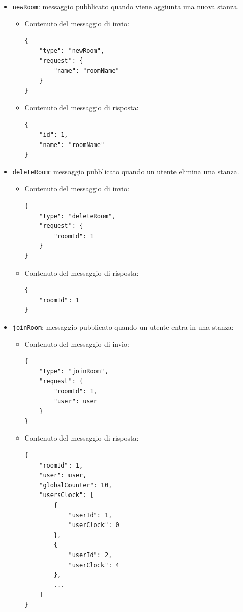 \documentclass[a4paper]{article}
\begin{document}
\begin{itemize}
\begin{itemize}
\begin{verbatim}
    {
        "id": 2,
        "name": "roomName"
    },
    
    ...
]
            \end{verbatim}
        \end{itemize}    

    \item \texttt{newRoom}: messaggio pubblicato quando viene aggiunta una nuova stanza.
        \begin{itemize}
            \item Contenuto del messaggio di invio:
            \begin{verbatim}
{
    "type": "newRoom",
    "request": {
        "name": "roomName"
    } 
}
            \end{verbatim}
            \item Contenuto del messaggio di risposta:
            \begin{verbatim}
{
    "id": 1,
    "name": "roomName"
}
            \end{verbatim}
        \end{itemize}

    \item \texttt{deleteRoom}: messaggio pubblicato quando un utente elimina una stanza.
        \begin{itemize}
            \item Contenuto del messaggio di invio:
            \begin{verbatim}
{
    "type": "deleteRoom",
    "request": {
        "roomId": 1
    } 
}
            \end{verbatim}
            \item Contenuto del messaggio di risposta:
            \begin{verbatim}
{
    "roomId": 1
}
            \end{verbatim}
        \end{itemize}    

    \item \texttt{joinRoom}: messaggio pubblicato quando un utente entra in una stanza:
        \begin{itemize}
            \item Contenuto del messaggio di invio:
            \begin{verbatim}
{
    "type": "joinRoom",
    "request": {
        "roomId": 1,
        "user": user
    } 
}
            \end{verbatim}
            \item Contenuto del messaggio di risposta:
            \begin{verbatim}
{
    "roomId": 1,
    "user": user,
    "globalCounter": 10,
    "usersClock": [
        {
            "userId": 1,
            "userClock": 0
        },
        {
            "userId": 2,
            "userClock": 4
        },
        ...
    ]
}
            \end{verbatim}
        \end{itemize}   


\end{itemize}
\end{document}

